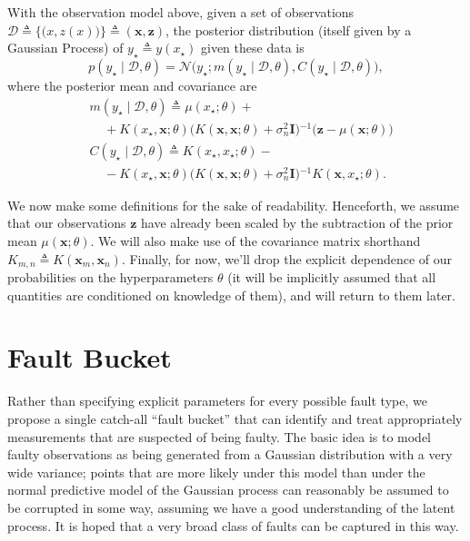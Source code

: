\documentclass{article}
\newcommand{\deq}{\ensuremath{\triangleq}}
\newcommand{\given}{\ensuremath{\mid}}
\newcommand{\cm}[1]{\ensuremath{\mathcal{#1}}}
\newcommand{\bm}[1]{\ensuremath{\mathbf{#1}}}
\newcommand{\data}{\ensuremath{\cm{D}}}
\newcommand{\inv}{\ensuremath{^{-1}}}
\newcommand{\vect}[1]{\bm{#1}}
\newcommand{\vz}{\vect{z}}
\newcommand{\vx}{\vect{x}}
\newcommand{\mean}[2]{{m}(#1 \given #2 )}
\newcommand{\cov}[2]{{C}(#1 \given #2 )}
\newcommand{\st}{_{\star}}
\newcommand{\defequal}{\triangleq}
\begin{document}
With the observation model above, given a set of observations
$
 \data
 \deq
 \bigl\lbrace
   \bigl( x, z(x) \bigr)
 \bigr\rbrace
 \deq
 ( \bm{x}, \bm{z} )
$,
the posterior distribution (itself given by a Gaussian Process) of $y\st \deq y(x\st)$ given these data is
\begin{equation*}
 p(y\st \given \data, \theta)
 =
 \cm{N}
 \bigl(
   y\st;
   \mean{y\st}{\data,\theta},
   \cov{y\st}{\data,\theta}
 \bigr),
\end{equation*}
where the posterior mean and covariance are
\begin{align*}
 &
 \mean{y\st}{\data,\theta}
 \deq
 \mu(x\st; \theta)
 +
 {}
 \\
 &
 \mspace{20mu}
 +
 K(x\st, \bm{x}; \theta)
 \bigl(
 K(\bm{x}, \bm{x}; \theta) + \sigma_n^2 \bm{I}
 \bigr)\inv
 \bigl(
   \bm{z} - \mu(\bm{x}; \theta)
 \bigr)
 \\  
 &
 \cov{y\st}{\data,\theta}
 \deq
 K(x\st, x\st; \theta)
 -
 {}
 \\
 &
 \mspace{20mu}
 -
 K(x\st, \bm{x}; \theta)
 \bigl(
   K(\bm{x}, \bm{x}; \theta) + \sigma_n^2 \bm{I}
 \bigr)\inv
 K(\bm{x}, x\st; \theta).
\end{align*}

We now make some definitions for the sake of readability. Henceforth,
we assume that our observations $\vz$ have already been scaled by the
subtraction of the prior mean $\mu(\bm{x}; \theta)$. We will also make
use of the covariance matrix shorthand $K_{m,n} \defequal
K(\vx_m,\vx_n)$. Finally, for now, we'll drop the explicit dependence
of our probabilities on the hyperparameters $\theta$ (it will be
implicitly assumed that all quantities are conditioned on knowledge of
them), and will return to them later.

\section{Fault Bucket}\label{bucket}

Rather than specifying explicit parameters for every possible fault
type, we propose a single catch-all ``fault bucket'' that can identify
and treat appropriately measurements that are suspected of being
faulty.  The basic idea is to model faulty observations as being
generated from a Gaussian distribution with a very wide variance;
points that are more likely under this model than under the normal
predictive model of the Gaussian process can reasonably be assumed to
be corrupted in some way, assuming we have a good understanding of the
latent process. It is hoped that a very broad class of faults can be
captured in this way.
\end{document}
